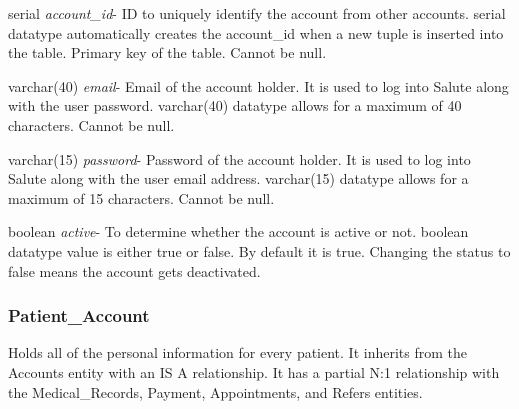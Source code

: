 \begin{description}
\item serial \textit{account\_id}- ID to uniquely identify the account from other accounts. serial datatype automatically creates the account\_id when a new tuple is inserted into the table.  Primary key of the table.  Cannot be null.
\item varchar(40) \textit{email}- Email of the account holder. It is used to log into Salute along with the user password.  varchar(40) datatype allows for a maximum of 40 characters.  Cannot be null.
\item varchar(15) \textit{password}-  Password of the account holder.  It is used to log into Salute along with the user email address.  varchar(15) datatype allows for a maximum of 15 characters.  Cannot be null.
\item boolean \textit{active}- To determine whether the account is active or not.  boolean datatype value is either true or false.  By default it is true.  Changing the status to false means the account gets deactivated.
\end{description}

\subsubsection{Patient\_Account}
Holds all of the personal information for every patient.  It inherits from the Accounts entity with an IS A relationship.  It has a partial N:1 relationship with the Medical\_Records, Payment, Appointments, and Refers entities.

